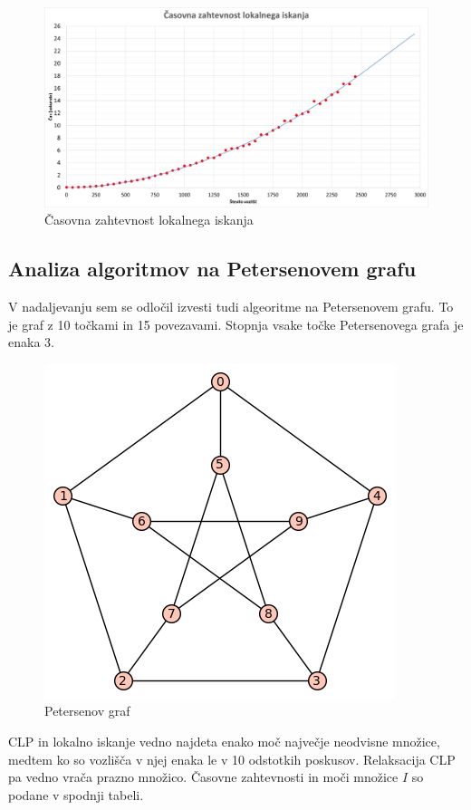 \documentclass[a4paper, 12 pt]{article}
\theoremstyle{definition}
\theoremstyle{plain}
\theoremstyle{remark}
\begin{document}
\begin{figure}[H]
\centering
  \includegraphics[scale=0.29]{casovna_ zahtevnost_LOKISK.png}
  \caption{Časovna zahtevnost lokalnega iskanja}
  \label{fig:casovna zahtevnost} 
\end{figure}


\subsection{Analiza algoritmov na Petersenovem grafu}
V nadaljevanju sem se odločil izvesti tudi algeoritme na Petersenovem grafu. To je graf z 10 točkami in 15 povezavami. Stopnja vsake točke Petersenovega grafa je enaka 3.


\begin{figure}[H]
\centering
  \includegraphics[scale=0.35]{Petersenov graf.png}
  \caption{Petersenov graf}
\end{figure}

CLP in lokalno iskanje vedno najdeta enako moč največje neodvisne množice, medtem ko so vozlišča v njej enaka le v 10 odstotkih poskusov. Relaksacija CLP pa vedno vrača prazno množico. Časovne zahtevnosti in moči množice $I$ so podane v spodnji tabeli.
\end{document}
